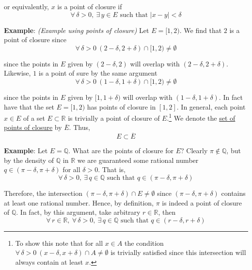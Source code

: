 \documentclass[12pt]{article}
\newlength\tindent
\renewcommand{\indent}{\hspace*{\tindent}}
\newcommand{\R}{\mathbb R}
\newcommand{\Q}{\mathbb Q}
\begin{document}
or equivalently, $x$ is a point of closure if
\begin{equation*}
	\forall\,\delta > 0,~\exists\,y\in E \text{ such that } |x - y| < \delta
\end{equation*}

%
%
{\bf Example}: {\em (Example using points of closure)} Let $E = [1, 2)$. We find that $2$ is a point of closure since
\begin{equation*}
	\forall\,\delta > 0 ~ (2 - \delta, 2 + \delta) \cap [1, 2) \neq \emptyset
\end{equation*}

since the points in $E$ given by $(2-\delta, 2)$ will overlap with $(2 - \delta, 2 + \delta)$. Likewise, $1$ is a point of sure by the same argument
\begin{equation*}
	\forall\,\delta > 0 ~ (1 - \delta, 1 + \delta) \cap [1, 2) \neq \emptyset
\end{equation*}

since the points in $E$ given by $[1, 1 + \delta)$ will overlap with $(1 - \delta, 1 + \delta)$. In fact have that the set $E = [1, 2)$ has points of closure in $[1, 2]$. In general, each point $x \in E$ of a set $E \subset \R$ is trivially a point of closure of $E$.\footnote{To show this note that for all $x \in A$ the condition $\forall\,\delta > 0~ (x - \delta, x + \delta) \cap A \neq \emptyset$ is trivially satisfied since this intersection will always contain at least $x$.} We denote the \underline{set of points of closure} by $\overline{E}$. Thus,
\begin{equation*}
	E \subset \overline{E}
\end{equation*}

%
%
{\bf Example}: Let $E = \Q$. What are the points of closure for $E$? Clearly $\pi \notin \Q$, but by the density of $\Q$ in $\R$ we are guaranteed some rational number $q \in (\pi - \delta, \pi + \delta)$ for all $\delta > 0$. That is,
\begin{equation*}
	\forall\,\delta > 0,~\exists\,q\in\Q \text{ such that } q \in (\pi - \delta, \pi + \delta)
\end{equation*}

\indent Therefore, the intersection $(\pi - \delta, \pi + \delta) \cap E \neq \emptyset$ since $(\pi - \delta, \pi + \delta)$ contains at least one rational number. Hence, by definition, $\pi$ is indeed a point of closure of $\Q$. In fact, by this argument, take arbitrary $r \in \R$, then
\begin{equation*}
	\forall\,r\in\R,~\forall\,\delta > 0,~\exists\,q\in\Q \text{ such that } q \in (r - \delta, r + \delta)
\end{equation*}
\end{document}
